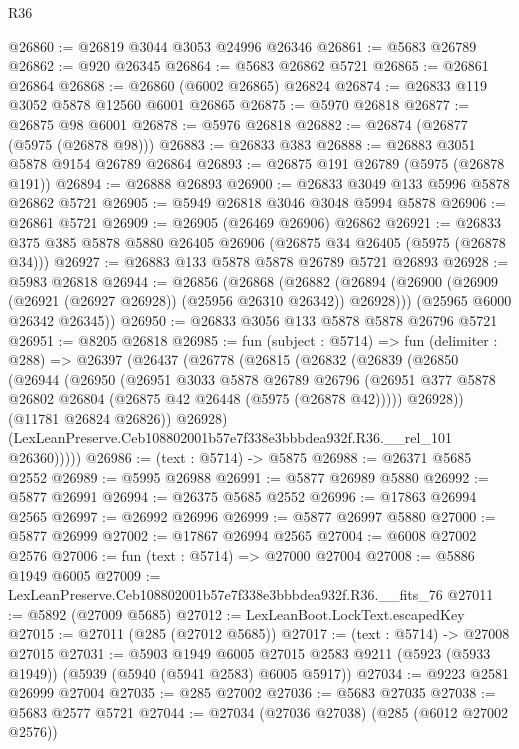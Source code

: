 \begin{lexlean}{R36}
\begin{coremodule}
@26860 := @26819 @3044 @3053 @24996 @26346
@26861 := @5683 @26789
@26862 := @920 @26345
@26864 := @5683 @26862 @5721
@26865 := @26861 @26864
@26868 := @26860 (@6002 @26865) @26824
@26874 := @26833 @119 @3052 @5878 @12560 @6001 @26865
@26875 := @5970 @26818
@26877 := @26875 @98 @6001
@26878 := @5976 @26818
@26882 := @26874 (@26877 (@5975 (@26878 @98)))
@26883 := @26833 @383
@26888 := @26883 @3051 @5878 @9154 @26789 @26864
@26893 := @26875 @191 @26789 (@5975 (@26878 @191))
@26894 := @26888 @26893
@26900 := @26833 @3049 @133 @5996 @5878 @26862 @5721
@26905 := @5949 @26818 @3046 @3048 @5994 @5878
@26906 := @26861 @5721
@26909 := @26905 (@26469 @26906) @26862
@26921 := @26833 @375 @385 @5878 @5880 @26405 @26906 (@26875 @34 @26405 (@5975 (@26878 @34)))
@26927 := @26883 @133 @5878 @5878 @26789 @5721 @26893
@26928 := @5983 @26818
@26944 := @26856
    (@26868
      (@26882 (@26894 (@26900 (@26909 (@26921 (@26927 @26928)) (@25956 @26310 @26342)) @26928)))
      (@25965 @6000 @26342 @26345))
@26950 := @26833 @3056 @133 @5878 @5878 @26796 @5721
@26951 := @8205 @26818
@26985 := fun (subject : @5714) =>
  fun (delimiter : @288) =>
  @26397
    (@26437
      (@26778
        (@26815
          (@26832
            (@26839
              (@26850
                (@26944
                  (@26950
                    (@26951
                      @3033
                      @5878
                      @26789
                      @26796
                      (@26951 @377 @5878 @26802 @26804 (@26875 @42 @26448 (@5975 (@26878 @42)))))
                    @26928))
                (@11781 @26824 @26826))
              @26928)
            (LexLeanPreserve.Ceb108802001b57e7f338e3bbbdea932f.R36.__rel_101 @26360)))))
@26986 := (text : @5714) -> @5875
@26988 := @26371 @5685 @2552
@26989 := @5995 @26988
@26991 := @5877 @26989 @5880
@26992 := @5877 @26991
@26994 := @26375 @5685 @2552
@26996 := @17863 @26994 @2565
@26997 := @26992 @26996
@26999 := @5877 @26997 @5880
@27000 := @5877 @26999
@27002 := @17867 @26994 @2565
@27004 := @6008 @27002 @2576
@27006 := fun (text : @5714) => @27000 @27004
@27008 := @5886 @1949 @6005
@27009 := LexLeanPreserve.Ceb108802001b57e7f338e3bbbdea932f.R36.__fits_76
@27011 := @5892 (@27009 @5685)
@27012 := LexLeanBoot.LockText.escapedKey
@27015 := @27011 (@285 (@27012 @5685))
@27017 := (text : @5714) -> @27008 @27015
@27031 := @5903
    @1949
    @6005
    @27015
    @2583
    @9211
    (@5923 (@5933 @1949))
    (@5939 (@5940 (@5941 @2583) @6005 @5917))
@27034 := @9223 @2581 @26999 @27004
@27035 := @285 @27002
@27036 := @5683 @27035
@27038 := @5683 @2577 @5721
@27044 := @27034 (@27036 @27038) (@285 (@6012 @27002 @2576))

\end{coremodule}
\end{lexlean}
